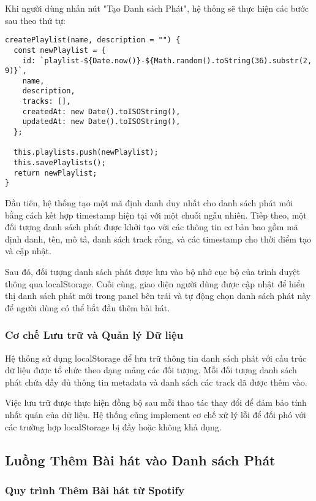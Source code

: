 \documentclass[12pt,a4paper]{article}
\begin{document}
Khi người dùng nhấn nút "Tạo Danh sách Phát", hệ thống sẽ thực hiện các bước sau theo thứ tự:

\begin{lstlisting}[caption={Tệp: src/services/unifiedPlaylistManager.js}]
createPlaylist(name, description = "") {
  const newPlaylist = {
    id: `playlist-${Date.now()}-${Math.random().toString(36).substr(2, 9)}`,
    name,
    description,
    tracks: [],
    createdAt: new Date().toISOString(),
    updatedAt: new Date().toISOString(),
  };

  this.playlists.push(newPlaylist);
  this.savePlaylists();
  return newPlaylist;
}
\end{lstlisting}

Đầu tiên, hệ thống tạo một mã định danh duy nhất cho danh sách phát mới bằng cách kết hợp timestamp hiện tại với một chuỗi ngẫu nhiên. Tiếp theo, một đối tượng danh sách phát được khởi tạo với các thông tin cơ bản bao gồm mã định danh, tên, mô tả, danh sách track rỗng, và các timestamp cho thời điểm tạo và cập nhật.

Sau đó, đối tượng danh sách phát được lưu vào bộ nhớ cục bộ của trình duyệt thông qua localStorage. Cuối cùng, giao diện người dùng được cập nhật để hiển thị danh sách phát mới trong panel bên trái và tự động chọn danh sách phát này để người dùng có thể bắt đầu thêm bài hát.

\subsubsection{Cơ chế Lưu trữ và Quản lý Dữ liệu}

Hệ thống sử dụng localStorage để lưu trữ thông tin danh sách phát với cấu trúc dữ liệu được tổ chức theo dạng mảng các đối tượng. Mỗi đối tượng danh sách phát chứa đầy đủ thông tin metadata và danh sách các track đã được thêm vào.

Việc lưu trữ được thực hiện đồng bộ sau mỗi thao tác thay đổi để đảm bảo tính nhất quán của dữ liệu. Hệ thống cũng implement cơ chế xử lý lỗi để đối phó với các trường hợp localStorage bị đầy hoặc không khả dụng.

\subsection{Luồng Thêm Bài hát vào Danh sách Phát}

\subsubsection{Quy trình Thêm Bài hát từ Spotify}
\end{document}
